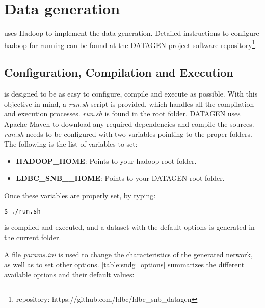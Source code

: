 \section{Data generation}
\label{section:data_generation}

\datagen uses Hadoop to implement the data generation. Detailed instructions
to configure hadoop for running \datagen can be found at the DATAGEN project
software repository\footnote{ \datagen repository:
https://github.com/ldbc/ldbc\_snb\_datagen}. 

\subsection{\datagen Configuration, Compilation and Execution}

\datagen is designed to be as easy to configure, compile and execute as
possible. With this objective in mind, a \textit{run.sh} script is provided,
which handles all the compilation and execution processes.  \textit{run.sh}
is found in the \datagen root folder. DATAGEN uses Apache Maven to download any
required dependencies and compile the sources.  \textit{run.sh} needs to be
configured with two variables pointing to the proper folders. The following is
the list of variables to set:

\begin{itemize}
    \item \textbf{HADOOP\_HOME}: Points to your hadoop root folder.
    \item \textbf{LDBC\_SNB\_\datagen\_HOME}: Points to your DATAGEN root folder.
\end{itemize}

Once these variables are properly set, by typing:

\begin{lstlisting}[backgroundcolor=\color{gray}, frame=single, language=bash]
$ ./run.sh
\end{lstlisting}

\datagen is compiled and executed, and a dataset with the default options is
generated in the current folder.

A file \textit{params.ini} is used to change the characteristics of the
generated network, as well as to set other options. \autoref{table:sndg_options}
summarizes the different available options and their default values:

